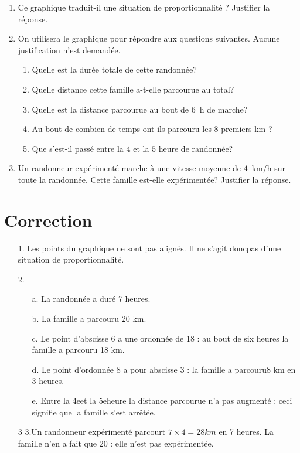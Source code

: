 \documentclass[11pt]{article}
\begin{document}
\begin{enumerate}
\item Ce graphique traduit-il une situation de proportionnalité ? Justifier la réponse.
\item On utilisera le graphique pour répondre aux questions suivantes. Aucune justification n'est
demandée.
	\begin{enumerate}
		\item Quelle est la durée totale de cette randonnée?
		\item Quelle distance cette famille a-t-elle parcourue au total?
		\item Quelle est la distance parcourue au bout de $6$~h de marche?
		\item Au bout de combien de temps ont-ils parcouru les $8$ premiers km ?
		\item Que s'est-il passé entre la $4$ et la $5$ heure de randonnée?
	\end{enumerate}
\item  Un randonneur expérimenté marche à une vitesse moyenne de $4$~km/h sur toute la randonnée.
Cette famille est-elle expérimentée? Justifier la réponse.
\end{enumerate}

\newpage

\section*{Correction}

	\begin{enumerate}
		\item[1.] Les points du graphique ne sont pas alignés. Il ne s’agit doncpas d’une situation de proportionnalité.
    \item[2.]
    \begin{enumerate}
		  \item[a.] La randonnée a duré 7 heures.
      \item[b.] La famille a parcouru 20 km.
      \item[c.] Le point d’abscisse 6 a une ordonnée de 18 : au bout de six heures la famille a parcouru 18 km.
      \item[d.] Le point d’ordonnée 8 a pour abscisse 3 : la famille a parcouru8 km en 3 heures.
      \item[e.] Entre la 4eet la 5eheure la distance parcourue n’a pas augmenté : ceci signifie que la famille s’est arrêtée.
      \end{enumerate}
    \item[3] 3.Un randonneur expérimenté parcourt $7 \times 4=28 km$ en 7 heures. La famille n’en a fait que 20 : elle n’est pas expérimentée.
    \end{enumerate}
\end{document}
